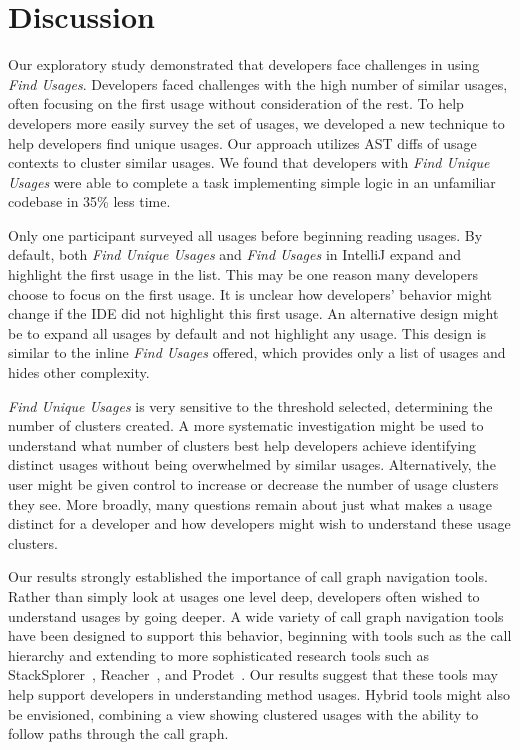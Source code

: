 \documentclass[conference]{IEEEtran}
\begin{document}
\section{Discussion}
Our exploratory study demonstrated that developers face challenges in using \textit{Find Usages}. Developers faced challenges with the high number of similar usages, often focusing on the first usage without consideration of the rest. To help developers more easily survey the set of usages, we developed a new technique to help developers find unique usages. Our approach utilizes AST diffs of usage contexts to cluster similar usages. We found that developers with \textit{Find Unique Usages} were able to complete a task implementing simple logic in an unfamiliar codebase in 35\% less time. 


Only one participant surveyed all usages before beginning reading usages. By default, both \textit{Find Unique Usages} and \textit{Find Usages} in IntelliJ expand and highlight the first usage in the list. This may be one reason many developers choose to focus on the first usage. It is unclear how developers' behavior might change if the IDE did not highlight this first usage. An alternative design might be to expand all usages by default and not highlight any usage. 
This design is similar to the inline \textit{Find Usages} offered, which provides only a list of usages and hides other complexity. \par


\textit{Find Unique Usages} is very sensitive to the threshold selected, determining the number of clusters created. A more systematic investigation might be used to understand what number of clusters best help developers achieve identifying distinct usages without being overwhelmed by similar usages. 
Alternatively, the user might be given control to increase or decrease the number of usage clusters they see.
More broadly, many questions remain about just what makes a usage distinct for a developer and how developers might wish to understand these usage clusters.

Our results strongly established the importance of call graph navigation tools. Rather than simply look at usages one level deep, developers often wished to understand usages by going deeper. A wide variety of call graph navigation tools have been designed to support this behavior, beginning with tools such as the call hierarchy and extending to more sophisticated research tools such as StackSplorer~\cite{karrer2011stacksplorer}, Reacher~\cite{latoza2011visualizing}, and Prodet~\cite{augustine2015field}. Our results suggest that these tools may help support developers in understanding method usages. Hybrid tools might also be envisioned, combining a view showing clustered usages with the ability to follow paths through the call graph. 
\end{document}
